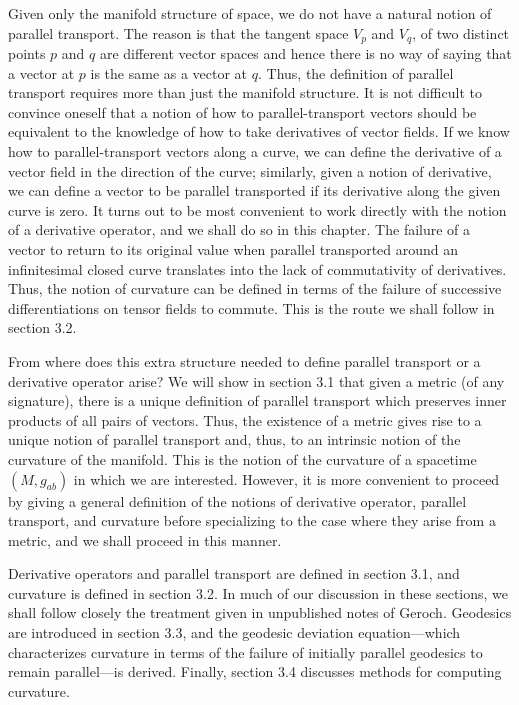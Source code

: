 Given only the manifold structure of space, we do not have a natural notion of parallel transport. The reason is that the tangent space $V_p$ and $V_q$, of two distinct points $p$ and $q$ are different vector spaces and hence there is no way of saying that a vector at $p$ is the same as a vector at $q$. Thus, the definition of parallel transport requires more than just the manifold structure. It is not difficult to convince oneself that a notion of how to parallel-transport vectors should be equivalent to the knowledge of how to take derivatives of vector fields. If we know how to parallel-transport vectors along a curve, we can define the derivative of a vector field in the direction of the curve; similarly, given a notion of derivative, we can define a vector to be parallel transported if its derivative along the given curve is zero. It turns out to be most convenient to work directly with the notion of a derivative operator, and we shall do so in this chapter. The failure of a vector to return to its original value when parallel transported around an infinitesimal closed curve translates into the lack of commutativity of derivatives. Thus, the notion of curvature can be defined in terms of the failure of successive differentiations on tensor fields to commute. This is the route we shall follow in section 3.2.

From where does this extra structure needed to define parallel transport or a derivative operator arise? We will show in section 3.1 that given a metric (of any signature), there is a unique definition of parallel transport which preserves inner products of all pairs of vectors. Thus, the existence of a metric gives rise to a unique notion of parallel transport and, thus, to an intrinsic notion of the curvature of the manifold. This is the notion of the curvature of a spacetime $(M,g_{ab})$ in which we are interested. However, it is more convenient to proceed by giving a general definition of the notions of derivative operator, parallel transport, and curvature before specializing to the case where they arise from a metric, and we shall proceed in this manner.

Derivative operators and parallel transport are defined in section 3.1, and curvature is defined in section 3.2. In much of our discussion in these sections, we shall follow closely the treatment given in unpublished notes of Geroch. Geodesics are introduced in section 3.3, and the geodesic deviation equation—which characterizes curvature in terms of the failure of initially parallel geodesics to remain parallel—is derived. Finally, section 3.4 discusses methods for computing curvature.

